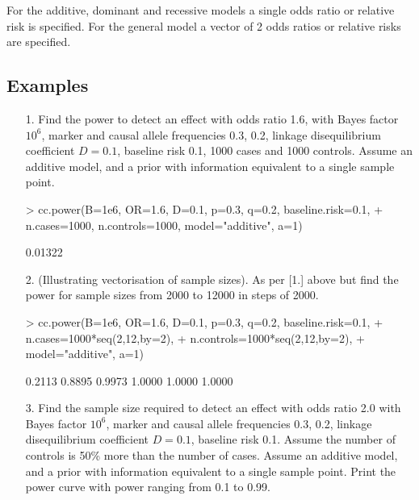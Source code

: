\documentclass[a4paper,10pt]{amsart}
\begin{document}
For the additive, dominant and recessive models a single odds ratio or relative risk is
specified. For the general model a vector of 2 odds ratios or relative risks are specified.

\subsection{Examples}
\begin{itemize}
\item[1.] Find the power to detect an effect with odds ratio 1.6, with
  Bayes factor $10^6$, marker and causal allele frequencies 0.3, 0.2,
  linkage disequilibrium coefficient $D=0.1$, baseline risk 0.1, 1000
  cases and 1000 controls.  Assume an additive model, and a prior with
  information equivalent to a single sample point.

\begin{Schunk}
\begin{Sinput}
> cc.power(B=1e6, OR=1.6, D=0.1, p=0.3, q=0.2, baseline.risk=0.1, 
+          n.cases=1000, n.controls=1000, model="additive", a=1)
\end{Sinput}
\begin{Soutput}
[1] 0.01322
\end{Soutput}
\end{Schunk}

\item[2.] (Illustrating vectorisation of sample sizes).
As per [1.] above but find the power for sample sizes
from 2000 to 12000 in steps of 2000.

\begin{Schunk}
\begin{Sinput}
> cc.power(B=1e6, OR=1.6, D=0.1, p=0.3, q=0.2, baseline.risk=0.1, 
+          n.cases=1000*seq(2,12,by=2), 
+          n.controls=1000*seq(2,12,by=2),
+          model="additive", a=1)
\end{Sinput}
\begin{Soutput}
[1] 0.2113 0.8895 0.9973 1.0000 1.0000 1.0000
\end{Soutput}
\end{Schunk}
\item[3.] Find the sample size required
to detect an effect with odds ratio 2.0 with Bayes factor $10^6$,
marker and causal allele frequencies 0.3, 0.2,
linkage disequilibrium coefficient $D=0.1$, baseline risk 0.1.
Assume the number of controls is 50\% more than the number of cases.
Assume an additive model, and a prior with information equivalent to
a single sample point.
Print the power curve with power ranging from 0.1 to 0.99.


\end{itemize}
\end{document}
